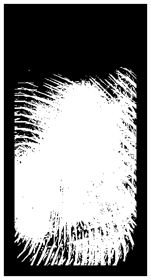 \documentclass{beamer}
\begin{document}
{\begin{figure}[!ht]
\begin{subfigure}[ht]{0.15\textwidth}
            \includegraphics[width=\textwidth]{fingerprints/2002Db2a/1_1_mask.jpg}
        \end{subfigure}
        \qquad
        \begin{subfigure}[ht]{0.15\textwidth}

\end{subfigure}
\end{figure}}
\end{document}
